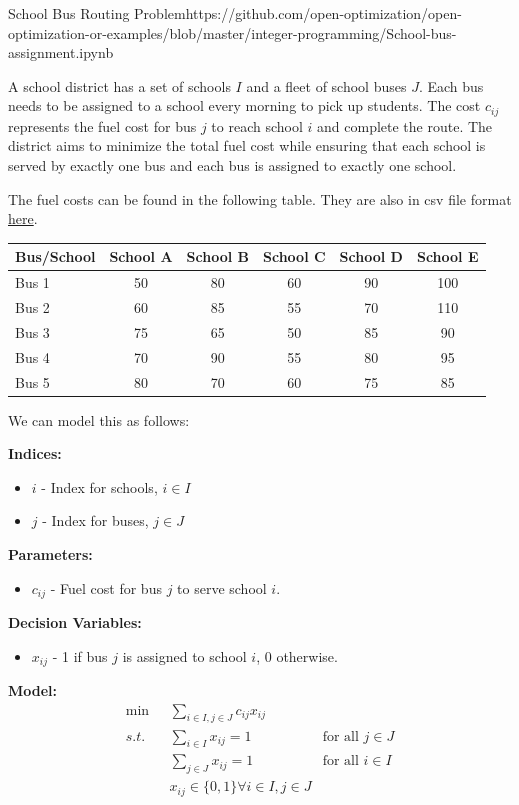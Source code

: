 \begin{examplewithcode}{School Bus Routing Problem}{https://github.com/open-optimization/open-optimization-or-examples/blob/master/integer-programming/School-bus-assignment.ipynb}

A school district has a set of schools \( I \) and a fleet of school buses \( J \). Each bus needs to be assigned to a school every morning to pick up students. The cost \( c_{ij} \) represents the fuel cost for bus \( j \) to reach school \( i \) and complete the route. The district aims to minimize the total fuel cost while ensuring that each school is served by exactly one bus and each bus is assigned to exactly one school.

The fuel costs can be found in the following table.  They are also in csv file format \href{https://github.com/open-optimization/open-optimization-or-examples/blob/master/integer-programming/school_bus_data.csv}{here}.
\begin{tabular}{l|ccccc}
\toprule
Bus/School & School A & School B & School C & School D & School E \\
\midrule
Bus 1 & 50 & 80 & 60 & 90 & 100 \\
Bus 2 & 60 & 85 & 55 & 70 & 110 \\
Bus 3 & 75 & 65 & 50 & 85 & 90 \\
Bus 4 & 70 & 90 & 55 & 80 & 95 \\
Bus 5 & 80 & 70 & 60 & 75 & 85 \\
\bottomrule
\end{tabular}

We can model this as follows:

\textbf{Indices:}
\begin{itemize}
    \item \(i \) - Index for schools, \(i \in I\)
    \item \(j \) - Index for buses, \(j \in J\)
\end{itemize}

\textbf{Parameters:}
\begin{itemize}
    \item \(c_{ij} \) - Fuel cost for bus \(j\) to serve school \(i\).
\end{itemize}

\textbf{Decision Variables:}
\begin{itemize}
    \item \(x_{ij} \) - 1 if bus \(j\) is assigned to school \(i\), 0 otherwise.
\end{itemize}

\textbf{Model:}
\begin{align*}
	\min\ \ \  & \sum_{i \in I, j \in J} c_{ij} x_{ij} \tag{Minimize total fuel cost}\\
	s.t. \ \ & \sum_{i \in I} x_{ij} = 1 & \text{for all $j \in J$} \tag{Each bus is assigned to one school}\\
	& \sum_{j \in J} x_{ij} = 1 & \text{for all $i\in I$} \tag{Each school is served by one bus}\\
	 & x_{ij} \in \{0,1\} \forall i \in I, j \in J
\end{align*}
\end{examplewithcode}

